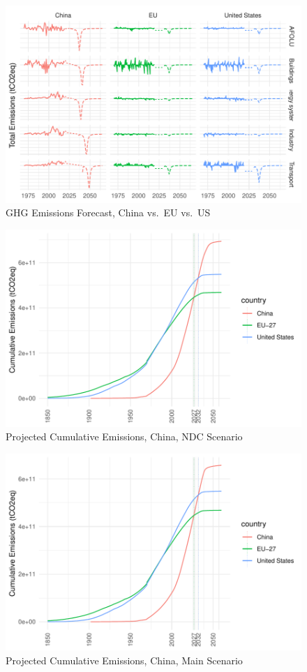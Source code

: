 \documentclass[
  12pt,
]{article}
\numberwithin{equation}{section}
\numberwithin{table}{section}
\numberwithin{figure}{section}
\begin{document}
\begin{figure}
\centering
\includegraphics{Paper_files/figure-latex/unnamed-chunk-10-1.pdf}
\caption{GHG Emissions Forecast, China vs.~EU vs.~US}
\end{figure}

\begin{figure}
\centering
\includegraphics{Paper_files/figure-latex/unnamed-chunk-11-1.pdf}
\caption{Projected Cumulative Emissions, China, NDC Scenario}
\end{figure}

\begin{figure}
\centering
\includegraphics{Paper_files/figure-latex/unnamed-chunk-12-1.pdf}
\caption{Projected Cumulative Emissions, China, Main Scenario}
\end{figure}
\end{document}

